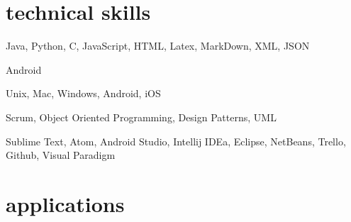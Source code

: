 \documentclass[]{friggeri-cv} %
\begin{document}

\section{technical skills}

\begin{description}[style=multiline,leftmargin=2.25cm]


\item[Languages]  Java, Python, C, JavaScript, HTML, Latex, MarkDown,  XML, JSON

\item[Frameworks]  Android

\item[OS]  Unix, Mac, Windows, Android, iOS

\item[Methodologies]  Scrum, Object Oriented Programming, Design Patterns, UML 

\item[Tools]  Sublime Text, Atom, Android Studio, Intellij IDEa, Eclipse, NetBeans, Trello, Github, Visual Paradigm


\end{description}


\newpage

\section{applications}
\end{document}
